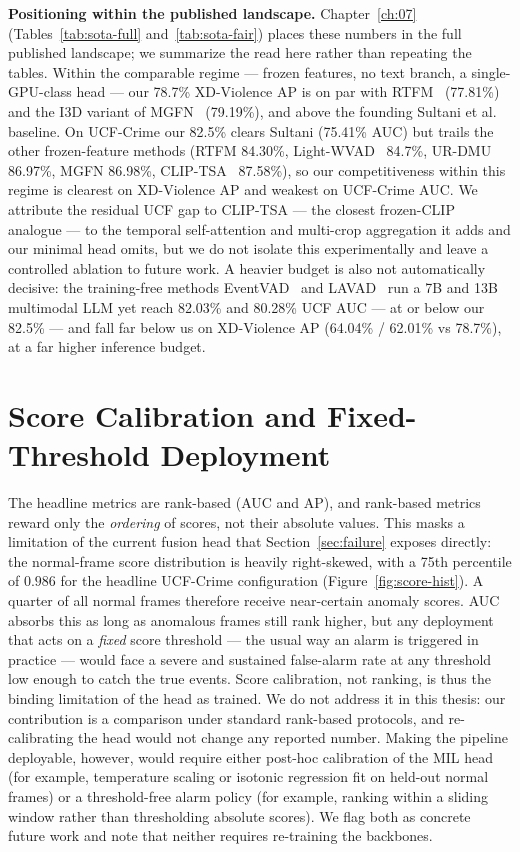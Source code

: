 \textbf{Positioning within the published landscape.} Chapter~\ref{ch:07}
(Tables~\ref{tab:sota-full} and~\ref{tab:sota-fair}) places these numbers in
the full published landscape; we summarize the read here rather than repeating
the tables. Within the comparable regime --- frozen features, no text branch,
a single-GPU-class head --- our 78.7\% XD-Violence AP is on par with
RTFM~\cite{tian2021rtfm} (77.81\%) and the I3D variant of
MGFN~\cite{chen2023mgfn} (79.19\%),
and above the founding Sultani et al.~\cite{sultani2018ucfcrime} baseline.
On UCF-Crime our 82.5\% clears Sultani (75.41\% AUC) but trails the other
frozen-feature methods (RTFM 84.30\%,
Light-WVAD~\cite{wang2024lightwvad} 84.7\%, UR-DMU~\cite{zhou2023urdmu}
86.97\%, MGFN 86.98\%,
CLIP-TSA~\cite{joo2023cliptsa} 87.58\%),
so our competitiveness within this regime is clearest on XD-Violence AP and
weakest on UCF-Crime AUC. We attribute the residual UCF gap to CLIP-TSA ---
the closest frozen-CLIP analogue --- to the temporal self-attention and
multi-crop aggregation it adds and our minimal head omits, but we do not
isolate this experimentally and leave a controlled ablation to future work. A
heavier budget is also not automatically decisive: the training-free methods
EventVAD~\cite{shao2025eventvad} and LAVAD~\cite{zanella2024lavad} run a 7B
and 13B multimodal LLM yet reach
82.03\% and 80.28\% UCF AUC --- at or below our 82.5\% --- and fall far below
us on XD-Violence AP
(64.04\% / 62.01\% vs 78.7\%), at a far higher inference budget.

\section{Score Calibration and Fixed-Threshold Deployment}
\label{sec:lim-calibration}

The headline metrics are rank-based (AUC and AP), and rank-based metrics reward
only the \emph{ordering} of scores, not their absolute values. This masks a
limitation of the current fusion head that Section~\ref{sec:failure} exposes
directly: the normal-frame score distribution is heavily right-skewed, with a
75th percentile of $0.986$ for the headline UCF-Crime configuration
(Figure~\ref{fig:score-hist}). A quarter of all normal frames therefore receive
near-certain anomaly scores. AUC absorbs this as long as anomalous frames still
rank higher, but any deployment that acts on a \emph{fixed} score threshold ---
the usual way an alarm is triggered in practice --- would face a severe and
sustained false-alarm rate at any threshold low enough to catch the true
events. Score calibration, not ranking, is thus the binding limitation of the
head as trained. We do not address it in this thesis: our contribution is a
comparison under standard rank-based protocols, and re-calibrating the head
would not change any reported number. Making the pipeline deployable, however,
would require either post-hoc calibration of the MIL head (for example,
temperature scaling or isotonic regression fit on held-out normal frames) or a
threshold-free alarm policy (for example, ranking within a sliding window
rather than thresholding absolute scores). We flag both as concrete future
work and note that neither requires re-training the backbones.

